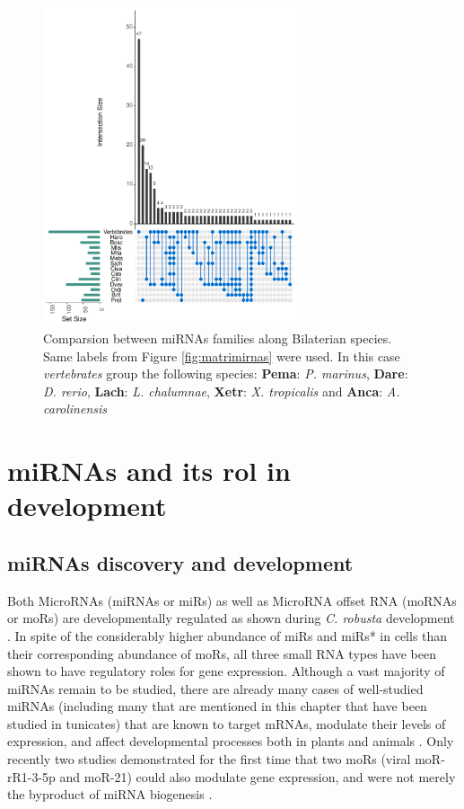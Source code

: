 \documentclass[graybox]{svmult}
\begin{document}
\begin{figure}[t]
\sidecaption[t]
\includegraphics[width=7.5cm]{./Images/vennmiRNAs}
\caption{Comparsion between miRNAs families along Bilaterian species. Same 
labels from Figure \ref{fig:matrimirnas} were used. In this case 
\textsl{vertebrates} group the following species: \textbf{Pema}: \textit{P. 
marinus}, \textbf{Dare}: \textit{D. rerio}, \textbf{Lach}: \textit{L. 
chalumnae}, \textbf{Xetr}: \textit{X. tropicalis} and \textbf{Anca}: \textit{A. 
carolinensis}}
\label{fig:vennDiagram}
\end{figure}

\section{miRNAs and its rol in development}
\label{sec:3}

\subsection{miRNAs discovery and development}

Both MicroRNAs (miRNAs or miRs) as well as MicroRNA offset RNA (moRNAs or moRs) 
are developmentally regulated as shown during \textit{C. robusta} development 
\cite{Shi2009}. In spite of the considerably higher abundance of miRs and 
miRs* in cells than their corresponding abundance of moRs, all three small RNA 
types have been shown to have regulatory roles for gene expression. Although a 
vast majority of miRNAs remain to be studied, there are already many cases of 
well-studied miRNAs (including many that are mentioned in this chapter that 
have been studied in tunicates) that are known to target mRNAs, modulate their 
levels of expression, and affect developmental processes both in plants and 
animals \cite{Zhao2018}. Only recently two studies demonstrated for 
the first time that two moRs (viral moR-rR1-3-5p and moR-21) could also 
modulate gene expression, and were not merely the byproduct of miRNA biogenesis 
\cite{UMBACH2010592, Zhao2016}.
\end{document}
